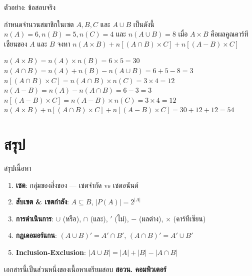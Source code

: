 \documentclass[11pt, aspectratio=169]{beamer}
\begin{document}
\begin{frame}{ตัวอย่าง: ข้อสอบจริง}
  \begin{exambox}[โจทย์ปี 67 ข้อ 13]
    กำหนดจำนวนสมาชิกในเซต $A, B, C$ และ $A \cup B$ เป็นดังนี้ $n(A)=6, n(B)=5, n(C)=4$ และ $n(A \cup B)=8$ เมื่อ $A \times B$ คือผลคูณคาร์ทีเซียนของ $A$ และ $B$ จงหา $n(A \times B) + n[(A \cap B) \times C] + n[(A-B) \times C]$
  \end{exambox}
  
  \begin{solbox}[วิธีทำ]
    $n(A \times B) = n(A) \times n(B) = 6 \times 5 = 30$ \newline
    $n(A \cap B) = n(A)+n(B)-n(A \cup B)=6+5-8=3$ \newline
    $n[(A \cap B) \times C] = n(A \cap B) \times n(C)=3\times 4=12$ \newline
    $n(A - B)=n(A)-n(A \cap B)=6-3=3$ \newline
    $n[(A-B) \times C]=n(A - B)\times n(C)=3\times 4=12$ \newline
    $n(A \times B) + n[(A \cap B) \times C] + n[(A-B) \times C]=30+12+12=54$
  \end{solbox}
\end{frame}

\section{สรุป}

\begin{frame}{สรุปเนื้อหา}
  \begin{explanation}[สิ่งที่ได้เรียนรู้]
    \begin{enumerate}
      \item \textbf{เซต}: กลุ่มของสิ่งของ — เซตจำกัด vs เซตอนันต์
      \item \textbf{สับเซต \& เซตกำลัง}: $A \subseteq B$, $|P(A)| = 2^{|A|}$
      \item \textbf{การดำเนินการ}: $\cup$ (หรือ), $\cap$ (และ), $'$ (ไม่), $-$ (ผลต่าง), $\times$ (คาร์ทีเซียน)
      \item \textbf{กฎเดอมอร์แกน}: $(A \cup B)' = A' \cap B'$, \quad $(A \cap B)' = A' \cup B'$
      \item \textbf{Inclusion-Exclusion}: $|A \cup B| = |A| + |B| - |A \cap B|$
    \end{enumerate}
  \end{explanation}

  \begin{center}
    \large เอกสารนี้เป็นส่วนหนึ่งของเนื้อหาเตรียมสอบ \textbf{สอวน. คอมพิวเตอร์}
  \end{center}
\end{frame}
\end{document}
